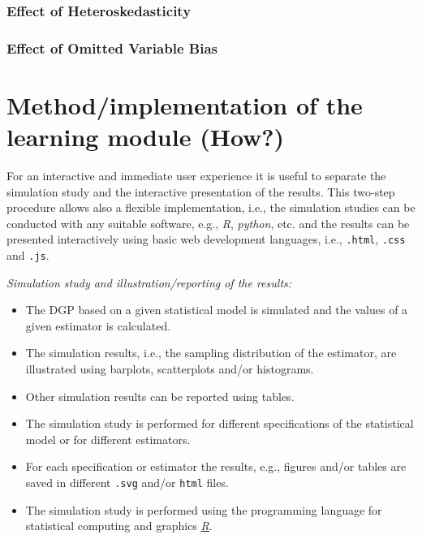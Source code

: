 \documentclass{article}
\begin{document}
\subsubsection{Effect of Heteroskedasticity}


\subsubsection{Effect of Omitted Variable Bias}






\section{Method/implementation of the learning module (How?)}

For an interactive and immediate user experience it is useful to separate the simulation study and the interactive presentation of the results. 
%
This two-step procedure allows also a flexible implementation, i.e., the simulation studies can be conducted with any suitable software, e.g., \emph{R}, \emph{python}, etc. and the results can be presented interactively using basic web development languages, i.e., \texttt{.html}, \texttt{.css} and \texttt{.js}.

\emph{Simulation study and illustration/reporting of the results:}

\begin{itemize}
	\item The DGP based on a given statistical model is simulated and the values of a given estimator is calculated.
	\item The simulation results, i.e., the sampling distribution of the estimator, are illustrated using  barplots, scatterplots and/or histograms.
	\item Other simulation results can be reported using tables.
	\item The simulation study is performed for different specifications of the statistical model or for different estimators.
	\item For each specification or estimator the results, e.g., figures and/or tables are saved in different \texttt{.svg} and/or \texttt{html} files.
	\item The simulation study is performed using the programming language for statistical computing and graphics \href{https://www.r-project.org/}{\emph{R}}.	
\end{itemize}
\end{document}
